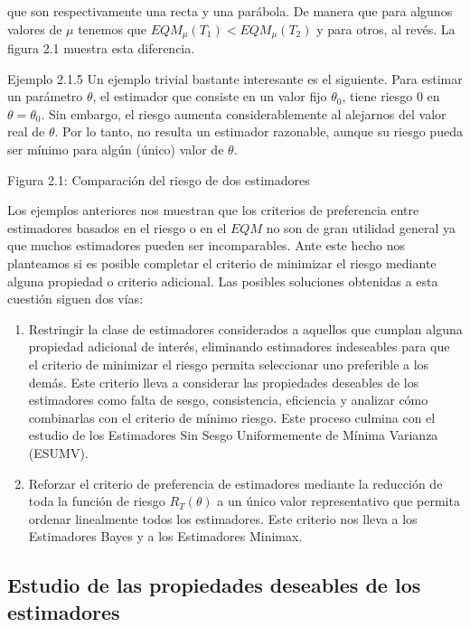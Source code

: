\documentclass[
]{article}
\providecommand{\tightlist}{%
  \setlength{\itemsep}{0pt}\setlength{\parskip}{0pt}}
\begin{document}
que son respectivamente una recta y una parábola. De manera que para algunos valores de \(\mu\) tenemos que \(E Q M_{\mu}\left(T_{1}\right)<E Q M_{\mu}\left(T_{2}\right)\) y para otros, al revés. La figura 2.1 muestra esta diferencia.

Ejemplo 2.1.5 Un ejemplo trivial bastante interesante es el siguiente. Para estimar un parámetro \(\theta\), el estimador que consiste en un valor fijo \(\theta_{0}\), tiene riesgo 0 en \(\theta=\theta_{0}\). Sin embargo, el riesgo aumenta considerablemente al alejarnos del valor real de \(\theta\). Por lo tanto, no resulta un estimador razonable, aunque su riesgo pueda ser mínimo para algún (único) valor de \(\theta\).

Figura 2.1: Comparación del riesgo de dos estimadores

Los ejemplos anteriores nos muestran que los criterios de preferencia entre estimadores basados en el riesgo o en el \(E Q M\) no son de gran utilidad general ya que muchos estimadores pueden ser incomparables. Ante este hecho nos planteamos si es posible completar el criterio de minimizar el riesgo mediante alguna propiedad o criterio adicional. Las posibles soluciones obtenidas a esta cuestión siguen dos vías:

\begin{enumerate}
\def\labelenumi{\arabic{enumi}.}
\tightlist
\item
  Restringir la clase de estimadores considerados a aquellos que cumplan alguna propiedad adicional de interés, eliminando estimadores indeseables para que el criterio de minimizar el riesgo permita seleccionar uno preferible a los demás. Este criterio lleva a considerar las propiedades deseables de los estimadores como falta de sesgo, consistencia, eficiencia y analizar cómo combinarlas con el criterio de mínimo riesgo. Este proceso culmina con el estudio de los Estimadores Sin Sesgo Uniformemente de Mínima Varianza (ESUMV).
\item
  Reforzar el criterio de preferencia de estimadores mediante la reducción de toda la función de riesgo \(R_{T}(\theta)\) a un único valor representativo que permita ordenar linealmente todos los estimadores. Este criterio nos lleva a los Estimadores Bayes y a los Estimadores Minimax.
\end{enumerate}

\subsection{Estudio de las propiedades deseables de los estimadores}\label{estudio-de-las-propiedades-deseables-de-los-estimadores}
\end{document}
